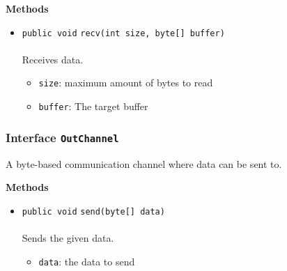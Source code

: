 \textbf{\sffamily Methods}
\begin{itemize}
\item \lstinline|public void| \lstinline|recv|\lstinline|(int size, byte[] buffer)|\\ \\[-0.6em]
Receives data.
\begin{itemize}
\item \lstinline|size|: maximum amount of bytes to read
\item \lstinline|buffer|: The target buffer
\end{itemize}



\end{itemize}

\subsubsection{Interface \lstinline|OutChannel|}
A byte-based communication channel where data can be sent to. \\
\noindent\begin{minipage}[t]{5cm}
\vspace{0.3em}
\hspace*{2em}
\vspace{0.3em}
\end{minipage}





\textbf{\sffamily Methods}
\begin{itemize}
\item \lstinline|public void| \lstinline|send|\lstinline|(byte[] data)|\\ \\[-0.6em]
Sends the given data.
\begin{itemize}
\item \lstinline|data|: the data to send
\end{itemize}



\end{itemize}


